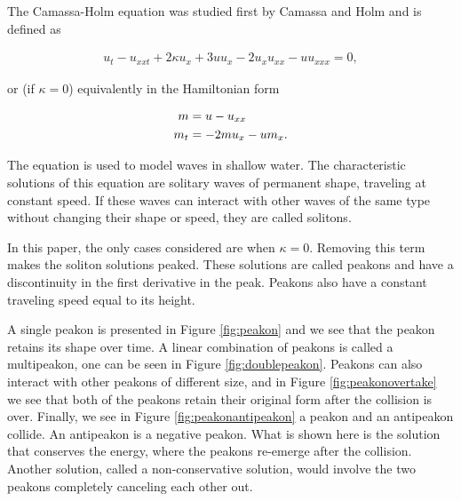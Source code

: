 The Camassa-Holm equation was studied first by Camassa and Holm \cite{camassa1993integrable} and is defined as

\begin{align*}
u_{t} - u_{xxt} + 2\kappa u_{x} + 3uu_{x} - 2u_{x}u_{xx} - uu_{xxx} = 0,
\end{align*}

or (if $\kappa = 0$) equivalently in the Hamiltonian form

\begin{align}
m &= u - u_{xx} \notag \\
m_t &= -2mu_x - um_x.
\label{eq:CHhamiltonian}
\end{align}

The equation is used to model waves in shallow water. The characteristic solutions of this equation are solitary waves of permanent shape, traveling at constant speed. If these waves can interact with other waves of the same type without changing their shape or speed, they are called solitons. 



In this paper, the only cases considered are when $\kappa = 0$. Removing this term makes the soliton solutions peaked. These solutions are called peakons and have a discontinuity in the first derivative in the peak. Peakons also have a constant traveling speed equal to its height.

A single peakon is presented in Figure \ref{fig:peakon} and we see that the peakon retains its shape over time. A linear combination of peakons is called a multipeakon, one can be seen in Figure \ref{fig:doublepeakon}. Peakons can also interact with other peakons of different size, and in Figure \ref{fig:peakonovertake} we see that both of the peakons retain their original form after the collision is over. Finally, we see in Figure \ref{fig:peakonantipeakon} a peakon and an antipeakon collide. An antipeakon is a negative peakon. What is shown here is the solution that conserves the energy, where the peakons re-emerge after the collision. Another solution, called a non-conservative solution, would involve the two peakons completely canceling each other out.


